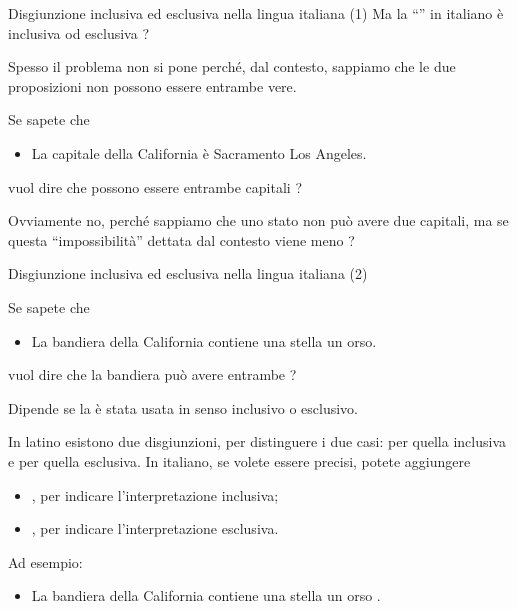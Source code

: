 \documentclass[10pt,dvipsnames]{beamer}
\begin{document}
\begin{frame}{Disgiunzione inclusiva ed esclusiva nella lingua italiana (1)}
    Ma la ``'' in italiano è inclusiva od esclusiva ?

    \pause
    \medskip
    Spesso il problema non si pone perché, dal contesto, sappiamo che le due proposizioni non possono essere entrambe vere.
    \begin{example}
        Se sapete che
        \begin{itemize}
            \item La capitale della California è Sacramento  Los Angeles.
        \end{itemize}
        vuol dire che possono essere entrambe capitali ?
    \end{example}

    \pause
    Ovviamente no, perché sappiamo che uno stato non può avere due capitali, ma se questa  ``impossibilità'' dettata dal contesto viene meno ?

\end{frame}

\begin{frame}{Disgiunzione inclusiva ed esclusiva nella lingua italiana (2)}
    \begin{example}
        Se sapete che
        \begin{itemize}
            \item La bandiera della California contiene una stella  un orso.
        \end{itemize}
        vuol dire che la bandiera può avere entrambe ?
    \end{example}

    \pause
    \medskip
    Dipende se la  è stata usata in senso inclusivo o esclusivo.

    \smallskip
    In latino esistono due disgiunzioni, per distinguere i due casi:  per quella inclusiva e  per quella esclusiva. In italiano, se volete essere precisi, potete aggiungere
    \begin{itemize}
        \item {}, per indicare l'interpretazione inclusiva;
        \item  {}, per indicare l'interpretazione esclusiva.
    \end{itemize}
    Ad esempio:
    \begin{itemize}
        \item La bandiera della California contiene una stella  un orso .
    \end{itemize}
\end{frame}
\end{document}
